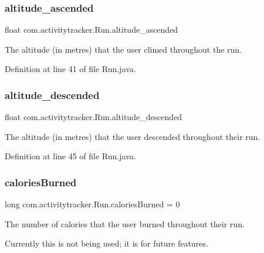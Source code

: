 \subsubsection{\texorpdfstring{altitude\+\_\+ascended}{altitude\_ascended}}
{\footnotesize\ttfamily float com.\+activitytracker.\+Run.\+altitude\+\_\+ascended\hspace{0.3cm}{\ttfamily [package]}}

The altitude (in metres) that the user climed throughout the run. 

Definition at line 41 of file Run.\+java.

\mbox{\label{classcom_1_1activitytracker_1_1_run_a26cd078680ee374482ce848b90308dda}} 
\subsubsection{\texorpdfstring{altitude\+\_\+descended}{altitude\_descended}}
{\footnotesize\ttfamily float com.\+activitytracker.\+Run.\+altitude\+\_\+descended\hspace{0.3cm}{\ttfamily [package]}}

The altitude (in metres) that the user descended throughout their run. 

Definition at line 45 of file Run.\+java.

\mbox{\label{classcom_1_1activitytracker_1_1_run_aa4c73467653a47d3b14ff6653bbab853}} 
\subsubsection{\texorpdfstring{calories\+Burned}{caloriesBurned}}
{\footnotesize\ttfamily long com.\+activitytracker.\+Run.\+calories\+Burned = 0\hspace{0.3cm}{\ttfamily [package]}}

The number of calories that the user burned throughout their run.

Currently this is not being used; it is for future features. 

